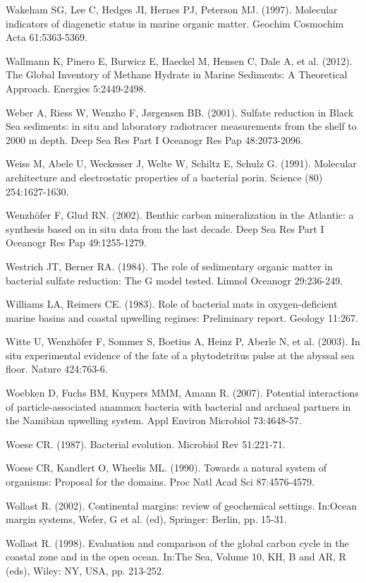 Wakeham SG, Lee C, Hedges JI, Hernes PJ, Peterson MJ. (1997). Molecular indicators of diagenetic status in marine organic matter. Geochim Cosmochim Acta 61:5363-5369.

Wallmann K, Pinero E, Burwicz E, Haeckel M, Hensen C, Dale A, et al. (2012). The Global Inventory of Methane Hydrate in Marine Sediments: A Theoretical Approach. Energies 5:2449-2498.

Weber A, Riess W, Wenzho F, J{\o}rgensen BB. (2001). Sulfate reduction in Black Sea sediments: in situ and laboratory radiotracer measurements from the shelf to 2000 m depth. Deep Sea Res Part I Oceanogr Res Pap 48:2073-2096.

Weiss M, Abele U, Weckesser J, Welte W, Schiltz E, Schulz G. (1991). Molecular architecture and electrostatic properties of a bacterial porin. Science (80) 254:1627-1630.

Wenzh\"ofer F, Glud RN. (2002). Benthic carbon mineralization in the Atlantic: a synthesis based on in situ data from the last decade. Deep Sea Res Part I Oceanogr Res Pap 49:1255-1279.

Westrich JT, Berner RA. (1984). The role of sedimentary organic matter in bacterial sulfate reduction: The G model tested. Limnol Oceanogr 29:236-249.

Williams LA, Reimers CE. (1983). Role of bacterial mats in oxygen-deficient marine basins and coastal upwelling regimes: Preliminary report. Geology 11:267.

Witte U, Wenzh\"ofer F, Sommer S, Boetius A, Heinz P, Aberle N, et al. (2003). In situ experimental evidence of the fate of a phytodetritus pulse at the abyssal sea floor. Nature 424:763-6.

Woebken D, Fuchs BM, Kuypers MMM, Amann R. (2007). Potential interactions of particle-associated anammox bacteria with bacterial and archaeal partners in the Namibian upwelling system. Appl Environ Microbiol 73:4648-57.

Woese CR. (1987). Bacterial evolution. Microbiol Rev 51:221-71.

Woese CR, Kandlert O, Wheelis ML. (1990). Towards a natural system of organisms: Proposal for the domains. Proc Natl Acad Sci 87:4576-4579.

Wollast R. (2002). Continental margins: review of geochemical settings. In:Ocean margin systems, Wefer, G et al. (ed), Springer: Berlin, pp. 15-31.

Wollast R. (1998). Evaluation and comparison of the global carbon cycle in the coastal zone and in the open ocean. In:The Sea, Volume 10, KH, B and AR, R (eds), Wiley: NY, USA, pp. 213-252.

